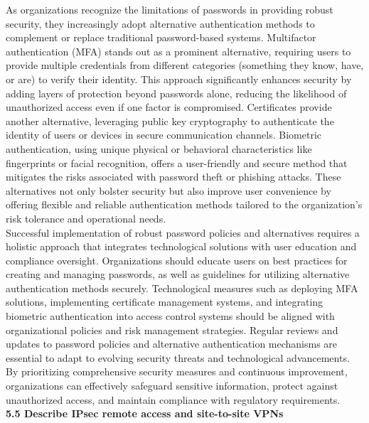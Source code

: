 \documentclass{article}
\begin{document}
	As organizations recognize the limitations of passwords in providing robust security, they increasingly adopt alternative authentication methods to complement or replace traditional password-based systems. Multifactor authentication (MFA) stands out as a prominent alternative, requiring users to provide multiple credentials from different categories (something they know, have, or are) to verify their identity. This approach significantly enhances security by adding layers of protection beyond passwords alone, reducing the likelihood of unauthorized access even if one factor is compromised. Certificates provide another alternative, leveraging public key cryptography to authenticate the identity of users or devices in secure communication channels. Biometric authentication, using unique physical or behavioral characteristics like fingerprints or facial recognition, offers a user-friendly and secure method that mitigates the risks associated with password theft or phishing attacks. These alternatives not only bolster security but also improve user convenience by offering flexible and reliable authentication methods tailored to the organization's risk tolerance and operational needs.\\
	
	Successful implementation of robust password policies and alternatives requires a holistic approach that integrates technological solutions with user education and compliance oversight. Organizations should educate users on best practices for creating and managing passwords, as well as guidelines for utilizing alternative authentication methods securely. Technological measures such as deploying MFA solutions, implementing certificate management systems, and integrating biometric authentication into access control systems should be aligned with organizational policies and risk management strategies. Regular reviews and updates to password policies and alternative authentication mechanisms are essential to adapt to evolving security threats and technological advancements. By prioritizing comprehensive security measures and continuous improvement, organizations can effectively safeguard sensitive information, protect against unauthorized access, and maintain compliance with regulatory requirements.\\
  
\noindent\textbf{5.5 Describe IPsec remote access and site-to-site VPNs}\\
\end{document}
